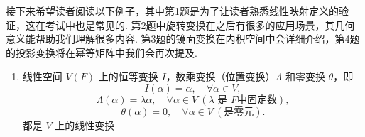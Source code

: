 接下来希望读者阅读以下例子，其中第1题是为了让读者熟悉线性映射定义的验证，这在考试中也是常见的. 第2题中旋转变换在之后有很多的应用场景，其几何意义能帮助我们理解很多内容. 第3题的镜面变换在内积空间中会详细介绍，第4题的投影变换将在幂等矩阵中我们会再次提及.


\begin{example}{}{}
    \begin{enumerate}
        \item
        线性空间 $V(F)$ 上的恒等变换 $I$，数乘变换（位置变换）$\Lambda$ 和零变换 $\theta$，即
        \[
        I(\alpha) = \alpha,\quad \forall \alpha \in V,
        \]
        \[
        \Lambda(\alpha) = \lambda \alpha, \quad \forall \alpha \in V\ ( \lambda \text{ 是 } F \text{中固定数} ),
        \]
        \[
        \theta(\alpha) = 0, \quad \forall \alpha \in V\ (\text{是零元}).
        \]
        都是 $V$ 上的线性变换


\end{enumerate}
\end{example}
